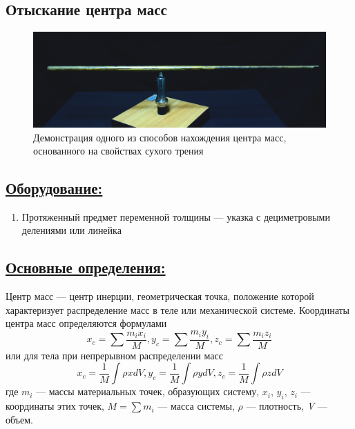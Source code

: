 \documentclass[14pt,a4paper,oneside]{extarticle}	%
\begin{document}
	
	\begin{center}
		\subsection*{Отыскание центра масс}
	\end{center}
	
	\begin{figure}[H] 	
		\centering 	
		\includegraphics[width=0.9\linewidth]{center-1.png}
		\caption{Демонстрация одного из способов нахождения центра масс, основанного на свойствах сухого трения}
		\label{center-1}
	\end{figure}
	
	\subsection*{\underline{Оборудование:}}
	
	\begin{enumerate} 
		\item Протяженный предмет переменной толщины — указка с дециметровыми делениями или линейка
	\end{enumerate}

\subsection*{\underline{Основные определения:}}
Центр масс — центр инерции, геометрическая точка, положение которой характеризует распределение масс в теле или механической системе. 
Координаты	центра масс определяются формулами
$$
	x_c =\sum \dfrac{m_i x_i}{M}, y_c =\sum \dfrac{m_i y_i}{M}, z_c =\sum \dfrac{m_i z_i}{M}
$$
	или для тела при непрерывном распределении масс 
$$
	x_c = \dfrac1M \int \rho x dV, y_c =\dfrac1M \int \rho y dV, z_c =\dfrac1M \int \rho z dV
$$
	где $ m_i $ — массы материальных точек, образующих систему, $ x_i $, $ y_i $, $ z_i $ — координаты этих точек, $ M = \sum m_i $ — масса системы, $ \rho $ — плотность, \textit{V} — объем. 
	
\end{document}
